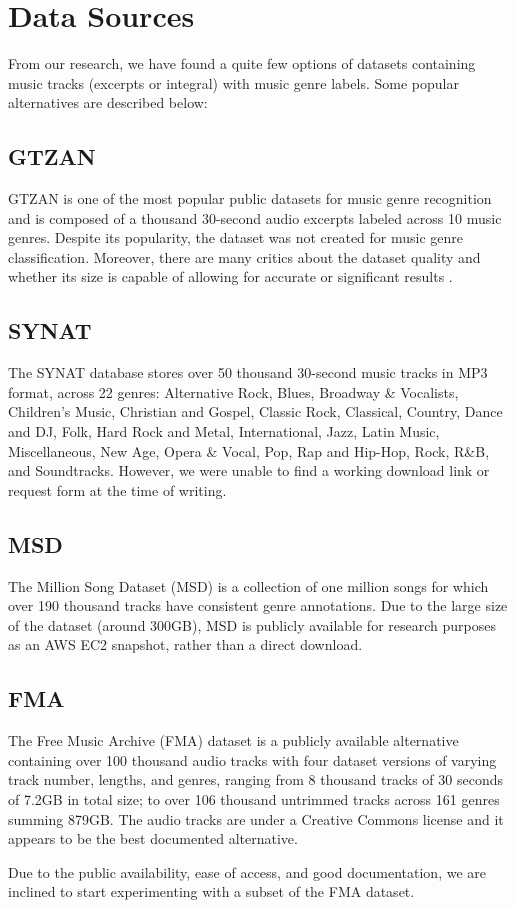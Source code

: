 \section{Data Sources}

From our research, we have found a quite few options of datasets containing music tracks (excerpts or integral) with music genre labels. Some popular alternatives are described below:

\subsection{GTZAN}

GTZAN is one of the most popular public datasets for music genre recognition \cite{Sturm2013} and is composed of a thousand 30-second audio excerpts labeled across 10 music genres. Despite its popularity, the dataset was not created for music genre classification. Moreover, there are many critics about the dataset quality and whether its size is capable of allowing for accurate or significant results \cite{Sturm2013}.

\subsection{SYNAT}

The SYNAT database \cite{10.1007/978-3-642-21916-0_75} stores over 50 thousand 30-second music tracks in MP3 format, across 22 genres: Alternative Rock, Blues, Broadway \& Vocalists, Children’s Music, Christian and Gospel, Classic Rock, Classical, Country, Dance and DJ, Folk, Hard Rock and Metal, International, Jazz, Latin Music, Miscellaneous, New Age, Opera \& Vocal, Pop, Rap and Hip-Hop, Rock, R\&B, and Soundtracks. However, we were unable to find a working download link or request form at the time of writing.

\subsection{MSD}

The Million Song Dataset (MSD) \cite{Bertin-Mahieux2011} is a collection of one million songs for which over 190 thousand tracks have consistent genre annotations. Due to the large size of the dataset (around 300GB), MSD is publicly available for research purposes as an AWS EC2 snapshot, rather than a direct download.

\subsection{FMA}

The Free Music Archive (FMA) dataset \cite{Defferrard2017} is a publicly available alternative containing over 100 thousand audio tracks with four dataset versions of varying track number, lengths, and genres, ranging from 8 thousand tracks of 30 seconds of 7.2GB in total size; to over 106 thousand untrimmed tracks across 161 genres summing 879GB. The audio tracks are under a Creative Commons license and it appears to be the best documented alternative.

Due to the public availability, ease of access, and good documentation, we are inclined to start experimenting with a subset of the FMA dataset.
